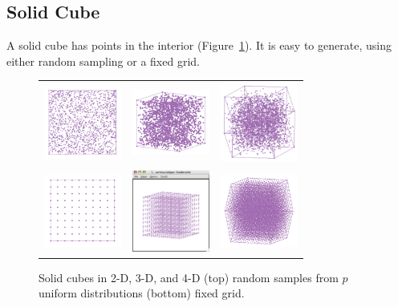 \subsection{Solid Cube}

A solid cube has points in the interior (Figure~\ref{solcube}). It is
easy to generate, using either random sampling or a fixed grid.

\begin{figure}[ht]
\centering
\begin{tabular}{c c c}
\includegraphics[width=1in]{fig/cube-2-solid.pdf} & \includegraphics[width=1in]{fig/cube-3-solid.pdf} & \includegraphics[width=1in]{fig/cube-4-solid.pdf} \\
\includegraphics[width=1in]{fig/cube-2-solideq-9.pdf} & \includegraphics[width=1in]{fig/cube-3-solideq-9.pdf} & \includegraphics[width=1in]{fig/cube-4-solideq-9.pdf}
\end{tabular}
\caption{Solid cubes in 2-D, 3-D, and 4-D (top) random samples from
  $p$ uniform distributions (bottom) fixed grid.}
\label{solcube}
\end{figure}

